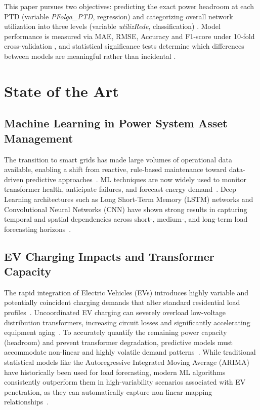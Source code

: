 \documentclass[conference]{IEEEtran}
\begin{document}
This paper pursues two objectives: predicting the exact power headroom at each PTD (variable \textit{PFolga\_PTD}, regression) and categorizing overall network utilization into three levels (variable \textit{utilizRede}, classification) \cite{ISEP2026}. Model performance is measured via MAE, RMSE, Accuracy and F1-score under 10-fold cross-validation \cite{Malakouti2023,ISEPMetricsRegression,ISEPMetricsClassification}, and statistical significance tests determine which differences between models are meaningful rather than incidental \cite{Hull1993,RCore2004}.

\section{State of the Art}

\subsection{Machine Learning in Power System Asset Management}

The transition to smart grids has made large volumes of operational data available, enabling a shift from reactive, rule-based maintenance toward data-driven predictive approaches~\cite{Heydt2010,Rana2025}. ML techniques are now widely used to monitor transformer health, anticipate failures, and forecast energy demand~\cite{Rajora2024,Rana2025}. Deep Learning architectures such as Long Short-Term Memory (LSTM) networks and Convolutional Neural Networks (CNN) have shown strong results in capturing temporal and spatial dependencies across short-, medium-, and long-term load forecasting horizons~\cite{Badhon2024,AlSelwi2024,Vanting2021}.

\subsection{EV Charging Impacts and Transformer Capacity}

The rapid integration of Electric Vehicles (EVs) introduces highly variable and potentially coincident charging demands that alter standard residential load profiles~\cite{Calero2020}. Uncoordinated EV charging can severely overload low-voltage distribution transformers, increasing circuit losses and significantly accelerating equipment aging~\cite{Jain2023,Hilshey2011}. To accurately quantify the remaining power capacity (headroom) and prevent transformer degradation, predictive models must accommodate non-linear and highly volatile demand patterns~\cite{ClementNyns2010}. While traditional statistical models like the Autoregressive Integrated Moving Average (ARIMA) have historically been used for load forecasting, modern ML algorithms consistently outperform them in high-variability scenarios associated with EV penetration, as they can automatically capture non-linear mapping relationships~\cite{DTU2025,ARIMA2023}.
\end{document}
